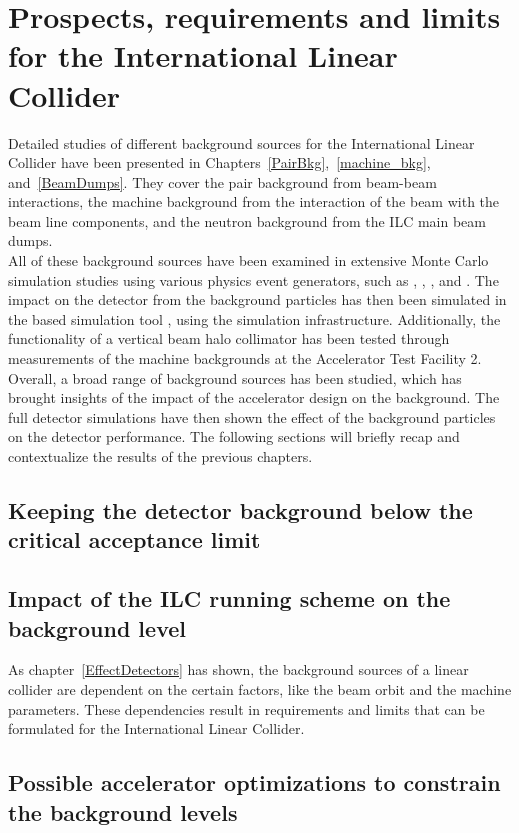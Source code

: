 \chapter{Prospects, requirements and limits for the International Linear Collider}
\label{Results}
Detailed studies of different background sources for the International Linear Collider have been presented in Chapters~\ref{PairBkg},~\ref{machine_bkg}, and~\ref{BeamDumps}.
They cover the \positron\electron pair background from beam-beam interactions, the machine background from the interaction of the beam with the beam line components, and the neutron background from the ILC main beam dumps.
\\All of these background sources have been examined in extensive Monte Carlo simulation studies using various physics event generators, such as \guineapig, \mucarlo, \bdsim, and \fluka.
The impact on the \sid detector from the background particles has then been simulated in the \geant based simulation tool \slic, using the \sid simulation infrastructure.
Additionally, the functionality of a vertical beam halo collimator has been tested through measurements of the machine backgrounds at the Accelerator Test Facility 2.
\\Overall, a broad range of background sources has been studied, which has brought insights of the impact of the accelerator design on the background.
The full detector simulations have then shown the effect of the background particles on the \sid detector performance.
The following sections will briefly recap and contextualize the results of the previous chapters.

\section{Keeping the detector background below the critical acceptance limit}

\section{Impact of the ILC running scheme on the background level}

As chapter~\ref{EffectDetectors} has shown, the background sources of a linear collider are dependent on the certain factors, like the beam orbit and the machine parameters.
These dependencies result in requirements and limits that can be formulated for the International Linear Collider.

\section{Possible accelerator optimizations to constrain the background levels}
